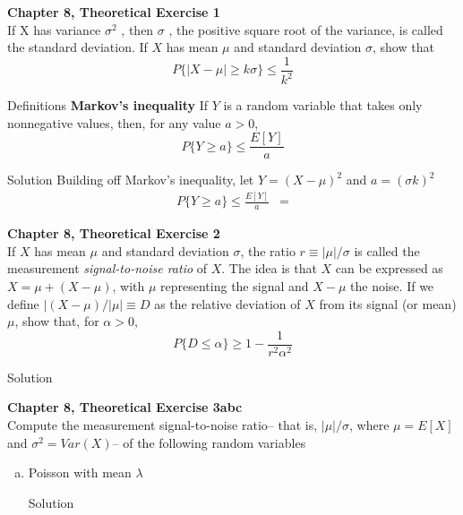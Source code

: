 \documentclass{article}
\begin{document}
\begin{spacing}{1.1}
\newpage
\begin{homeworkProblem}
  {\bf Chapter 8, Theoretical Exercise 1}\\
  If X has variance $\sigma^2$ , then $\sigma$ , the positive square root 
  of the variance, is called the standard deviation. If $X$ has mean $\mu$ 
  and standard deviation $\sigma$, show that
    \[P\{ |X - \mu| \ge k \sigma \} \le \frac{ 1}{ k^2}\]
  \begin{homeworkSection}{Definitions}
    {\bf Markov's inequality}
    If $Y$ is a random variable that takes only nonnegative values, 
    then, for any value $a > 0$,
      \[P\{ Y \ge a\} \le \frac{ E[ Y]}{ a}\]
  \end{homeworkSection}
  \begin{homeworkSection}{Solution}
    Building off Markov's inequality, let $Y = (X - \mu)^2$
    and $a = (\sigma k)^2$
    \begin{align*}
    P\{ Y \ge a\} \le \frac{ E[ Y]}{ a}
    & = 
    \end{align*}
  \end{homeworkSection}
\end{homeworkProblem}

\newpage
\begin{homeworkProblem}
  {\bf Chapter 8, Theoretical Exercise 2}\\
  If $X$ has mean $\mu$ and standard deviation $\sigma$, the ratio 
  $r \equiv |\mu|/\sigma$ is called the measurement \emph{signal-to-noise ratio} 
  of $X$. The idea is that $X$ can be expressed as $X = \mu + (X − \mu)$, with $\mu$ 
  representing the signal and $X − \mu$ the noise. If we define 
  $|(X − \mu)/|\mu| \equiv D$ as the relative deviation of $X$ from its signal 
  (or mean) $\mu$, show that, for $\alpha > 0$,
    \[P\{ D \le \alpha\} \ge 1 - \frac{ 1}{ r^2 \alpha^2}\]
  \begin{homeworkSection}{Solution}
    
  \end{homeworkSection}
\end{homeworkProblem}

\newpage
\begin{homeworkProblem}
  {\bf Chapter 8, Theoretical Exercise 3abc}\\
  Compute the measurement signal-to-noise ratio--
  that is, $|\mu|/\sigma$, where $\mu = E[ X]$ and $\sigma^2 = Var( X)$--
  of the following random variables
  \begin{enumerate}[(a)]
    \item Poisson with mean $\lambda$
      \begin{homeworkSection}{Solution}
      

\end{homeworkSection}
\end{enumerate}
\end{homeworkProblem}
\end{spacing}
\end{document}
